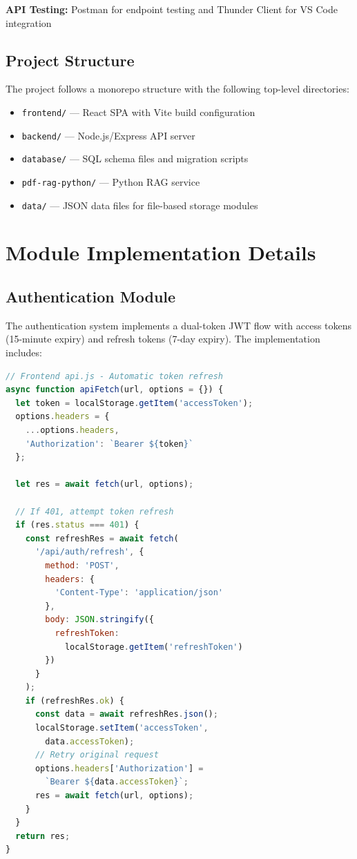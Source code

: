 \documentclass[12pt,a4paper]{report}
\begin{document}
\textbf{API Testing:} Postman for endpoint testing and Thunder Client for VS Code integration

\subsection{Project Structure}

The project follows a monorepo structure with the following top-level directories:

\begin{itemize}
    \item \texttt{frontend/} --- React SPA with Vite build configuration
    \item \texttt{backend/} --- Node.js/Express API server
    \item \texttt{database/} --- SQL schema files and migration scripts
    \item \texttt{pdf-rag-python/} --- Python RAG service
    \item \texttt{data/} --- JSON data files for file-based storage modules
\end{itemize}

\section{Module Implementation Details}

\subsection{Authentication Module}

The authentication system implements a dual-token JWT flow with access tokens (15-minute expiry) and refresh tokens (7-day expiry). The implementation includes:

\begin{lstlisting}[language=JavaScript, caption={JWT Token Refresh Flow}]
// Frontend api.js - Automatic token refresh
async function apiFetch(url, options = {}) {
  let token = localStorage.getItem('accessToken');
  options.headers = {
    ...options.headers,
    'Authorization': `Bearer ${token}`
  };

  let res = await fetch(url, options);

  // If 401, attempt token refresh
  if (res.status === 401) {
    const refreshRes = await fetch(
      '/api/auth/refresh', {
        method: 'POST',
        headers: {
          'Content-Type': 'application/json'
        },
        body: JSON.stringify({
          refreshToken:
            localStorage.getItem('refreshToken')
        })
      }
    );
    if (refreshRes.ok) {
      const data = await refreshRes.json();
      localStorage.setItem('accessToken',
        data.accessToken);
      // Retry original request
      options.headers['Authorization'] =
        `Bearer ${data.accessToken}`;
      res = await fetch(url, options);
    }
  }
  return res;
}
\end{lstlisting}
\end{document}

